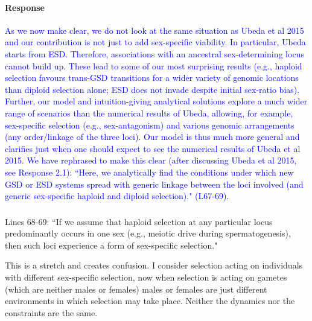 \documentclass[10pt,letterpaper]{article}
\begin{document}
\noindent\paragraph{Response}
\textcolor{blue}{
As we now make clear, we do not look at the same situation as Ubeda et al 2015 and our contribution is not just to add sex-specific viability. 
In particular, Ubeda starts from ESD. 
Therefore, associations with an ancestral sex-determining locus cannot build up. 
These lead to some of our most surprising results (e.g., haploid selection favours trans-GSD transitions for a wider variety of genomic locations than diploid selection alone; ESD does not invade despite initial sex-ratio bias). }
\textcolor{blue}{
Further, our model and intuition-giving analytical solutions explore a much wider range of scenarios than the numerical results of Ubeda, allowing, for example, sex-specific selection (e.g., sex-antagonism) and various genomic arrangements (any order/linkage of the three loci).
Our model is thus much more general and clarifies just when one should expect to see the numerical results of Ubeda et al 2015.
We have rephrased to make this clear (after discussing Ubeda et al 2015, see Response 2.1): ``Here, we analytically find the conditions under which new GSD or ESD systems spread with generic linkage between the loci involved (and generic sex-specific haploid and diploid selection)." (L67-69).
}

\noindent\subsubsection{}
Lines 68-69: ``If we assume that haploid selection at any particular locus predominantly occurs in one sex (e.g., meiotic drive during spermatogenesis), then such loci experience a form of sex-specific selection." 

This is a stretch and creates confusion. I consider selection acting on individuals with different sex-specific selection, now when selection is acting on gametes (which are neither males or females) males or females are just different environments in which selection may take place. Neither the dynamics nor the constraints are the same. 
\end{document}

